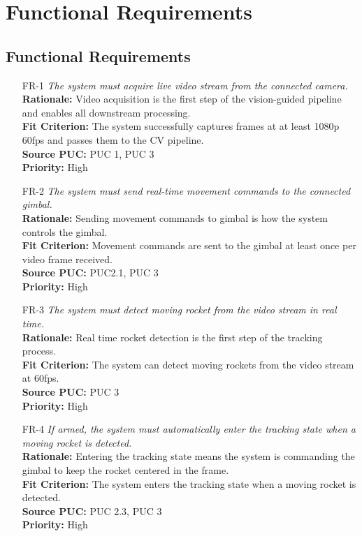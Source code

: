 \documentclass[12pt]{article}
\begin{document}
\section{Functional Requirements}
\subsection{Functional Requirements}

\begin{itemize}

  \item[FR-1] \emph{The system must acquire live video stream from the connected
          camera.}\\[2mm]
        {\bf Rationale:} Video acquisition is the first step of the vision-guided pipeline and enables all downstream processing.\\
        {\bf Fit Criterion:} The system successfully captures frames at at least 1080p 60fps and passes them to the CV pipeline.\\
        {\bf Source PUC:} PUC 1, PUC 3 \\
        {\bf Priority:} High

  \item[FR-2] \emph{The system must send real-time movement commands to the connected
          gimbal.}\\[2mm]
        {\bf Rationale:} Sending movement commands to gimbal is how the system controls the gimbal.\\
        {\bf Fit Criterion:} Movement commands are sent to the gimbal at least once per video frame received.\\
        {\bf Source PUC:} PUC2.1, PUC 3 \\
        {\bf Priority:} High

  \item[FR-3] \emph{The system must detect moving rocket from the video stream in real
          time.}\\[2mm]
        {\bf Rationale:} Real time rocket detection is the first step of the tracking process.\\
        {\bf Fit Criterion:} The system can detect moving rockets from the video stream at 60fps.\\
        {\bf Source PUC:} PUC 3 \\
        {\bf Priority:} High

  \item[FR-4] \emph{If armed, the system must automatically enter the tracking state
          when a moving rocket is detected.}\\[2mm]
        {\bf Rationale:} Entering the tracking state means the system is commanding the gimbal to keep the rocket centered in the frame.\\
        {\bf Fit Criterion:} The system enters the tracking state when a moving rocket is detected.\\
        {\bf Source PUC:} PUC 2.3, PUC 3 \\
        {\bf Priority:} High


\end{itemize}
\end{document}
